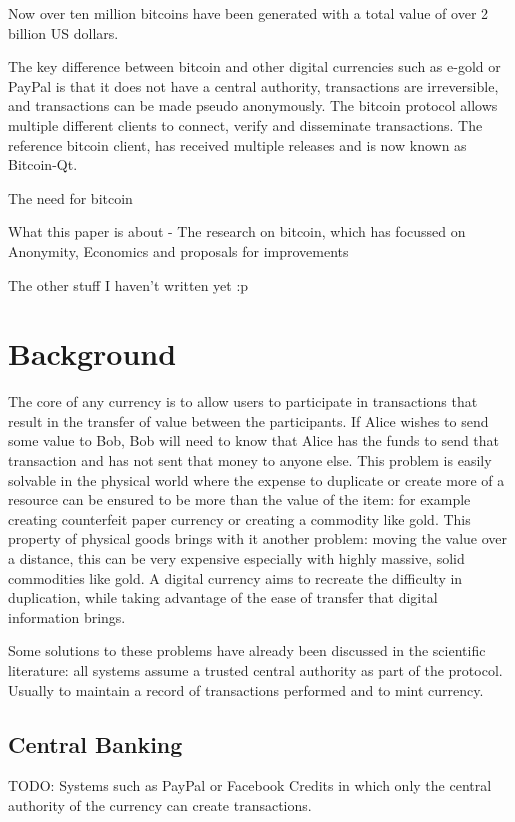 Now over ten million bitcoins have been generated with a total value of over 2 billion US dollars.

The key difference between bitcoin and other digital currencies such as e-gold or PayPal is that it does not have a central authority, transactions are irreversible, and transactions can be made pseudo anonymously.  The bitcoin protocol allows multiple different clients to connect, verify and disseminate transactions.  The reference bitcoin client, has received multiple releases and is now known as Bitcoin-Qt.

    The need for bitcoin

    What this paper is about - The research on bitcoin, which has focussed on Anonymity, Economics and proposals for improvements

    The other stuff I haven't written yet :p

\section{Background}
The core of any currency is to allow users to participate in transactions that result in the transfer of value between the participants.  If Alice wishes to send some value to Bob, Bob will need to know that Alice has the funds to send that transaction and has not sent that money to anyone else.  This problem is easily solvable in the physical world where the expense to duplicate or create more of a resource can be ensured to be more than the value of the item: for example creating counterfeit paper currency or creating a commodity like gold.  This property of physical goods brings with it another problem: moving the value over a distance, this can be very expensive especially with highly massive, solid commodities like gold.  A digital currency aims to recreate the difficulty in duplication, while taking advantage of the ease of transfer that digital information brings.

Some solutions to these problems have already been discussed in the scientific literature: all systems assume a trusted central authority as part of the protocol. Usually to maintain a record of transactions performed and to mint currency.

\subsection{Central Banking}
TODO: Systems such as PayPal or Facebook Credits in which only the central authority of the currency can create transactions.

